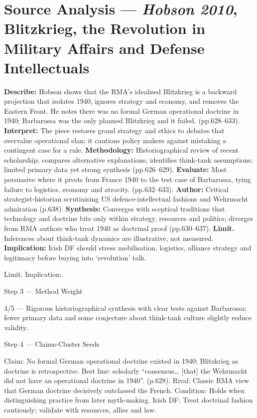 \section*{Source Analysis — \textit{Hobson 2010}, Blitzkrieg, the Revolution in Military Affairs and Defense Intellectuals}
\textbf{Describe:} Hobson shows that the RMA’s idealised Blitzkrieg is a backward projection that isolates 1940, ignores strategy and economy, and removes the Eastern Front. He notes there was no formal German operational doctrine in 1940; Barbarossa was the only planned Blitzkrieg and it failed. (pp.628–633).
\textbf{Interpret:} The piece restores grand strategy and ethics to debates that overvalue operational elan; it cautions policy makers against mistaking a contingent case for a rule.
\textbf{Methodology:} Historiographical review of recent scholarship; compares alternative explanations; identifies think-tank assumptions; limited primary data yet strong synthesis (pp.626–629).
\textbf{Evaluate:} Most persuasive where it pivots from France 1940 to the test case of Barbarossa, tying failure to logistics, economy and atrocity. (pp.632–633).
\textbf{Author:} Critical strategist-historian scrutinising US defence-intellectual fashions and Wehrmacht admiration (p.638).
\textbf{Synthesis:} Converges with sceptical traditions that technology and doctrine bite only within strategy, resources and politics; diverges from RMA authors who treat 1940 as doctrinal proof (pp.630–637).
\textbf{Limit.} Inferences about think-tank dynamics are illustrative, not measured.
\textbf{Implication:} Irish DF should stress mobilisation, logistics, alliance strategy and legitimacy before buying into ‘revolution’ talk.

Limit. Implication:.

Step 3 — Method Weight

4/5 — Rigorous historiographical synthesis with clear tests against Barbarossa; fewer primary data and some conjecture about think-tank culture slightly reduce validity.

Step 4 — Claims-Cluster Seeds

Claim: No formal German operational doctrine existed in 1940; Blitzkrieg as doctrine is retrospective.
Best line: scholarly “consensus… [that] the Wehrmacht did not have an operational doctrine in 1940”. (p.628).
Rival: Classic RMA view that German doctrine decisively outclassed the French.
Condition: Holds when distinguishing practice from later myth-making.
Irish DF: Treat doctrinal fashion cautiously; validate with resources, allies and law.

